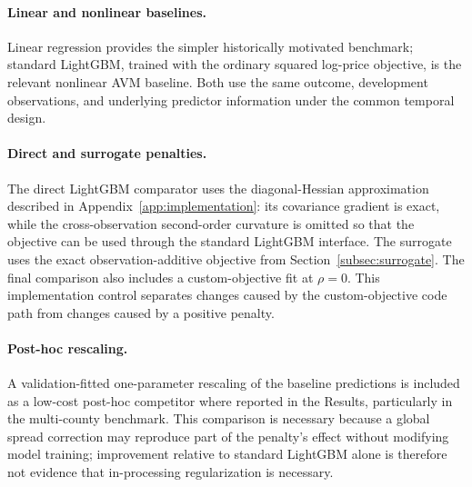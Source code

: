 \documentclass[10pt]{article}
\theoremstyle{definition}
\newcommand{\1}{\mathbf{1}}
\newcommand{\oldtext}[1]{\textcolor{blue}{\sout{#1}}}
\begin{document}
\paragraph{Linear and nonlinear baselines.}
\textcolor{impGreen}{Linear regression provides the simpler historically motivated benchmark; standard LightGBM, trained with the ordinary squared log-price objective, is the relevant nonlinear AVM baseline. Both use the same outcome, development observations, and underlying predictor information under the common temporal design.}

\paragraph{Direct and surrogate penalties.}
\textcolor{impGreen}{The direct LightGBM comparator uses the diagonal-Hessian approximation described in Appendix~\ref{app:implementation}: its covariance gradient is exact, while the cross-observation second-order curvature is omitted so that the objective can be used through the standard LightGBM interface. The surrogate uses the exact observation-additive objective from Section~\ref{subsec:surrogate}. The final comparison also includes a custom-objective fit at $\rho=0$. This implementation control separates changes caused by the custom-objective code path from changes caused by a positive penalty.}

\paragraph{Post-hoc rescaling.}
\textcolor{impGreen}{A validation-fitted one-parameter rescaling of the baseline predictions is included as a low-cost post-hoc competitor where reported in the Results, particularly in the multi-county benchmark. This comparison is necessary because a global spread correction may reproduce part of the penalty's effect without modifying model training; improvement relative to standard LightGBM alone is therefore not evidence that in-processing regularization is necessary.}
\end{document}
